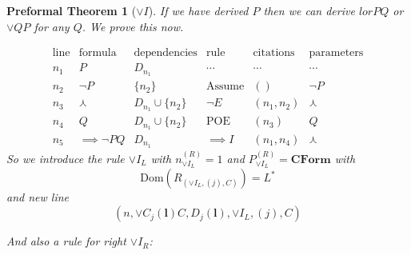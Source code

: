\documentclass[oneside, 12pt]{book}
\theoremstyle{break}
\newtheorem{preformal definition}[definition]{Preformal Definition}
\newtheorem{preformal theorem}[theorem]{Preformal Theorem}
\newcommand{\bv}[1]{\boldsymbol{#1}}
\begin{document}
		\begin{preformal theorem}[$\lor I$]
			If we have derived $P$ then we can derive $lor PQ$ or $\lor QP$ for any $Q$.
			We prove this now.
			
			\begin{equation*}
				\begin{array}{c|c|c|c|c|c}
					\text{line} & \text{formula} & \text{dependencies} & \text{rule} & \text{citations} & \text{parameters}\\ \hline
					n_1 & P & D_{n_1} & \cdots & \cdots & \cdots\\
					n_2 & \lnot P & \{n_2\} & \text{Assume} & () & \lnot P\\
					n_3 & \curlywedge & D_{n_1} \cup \{n_2\} & \lnot E & (n_1, n_2) & \curlywedge \\
					n_4 & Q & D_{n_1} \cup \{n_2\} & \text{POE} & (n_3) & Q\\
					n_5 & \implies \lnot P Q & D_{n_1} & \implies I & (n_1, n_4) & \curlywedge
				\end{array}
			\end{equation*}
			So we introduce the rule $\lor I_L$ with $n_{\lor I_L}^{(R)} = 1$ and $P_{\lor I_L}^{(R)} = \textbf{CForm}$ with
			\begin{equation*}
				\text{Dom}(R_{(\lor I_L, (j), C)}) = L^*
			\end{equation*}
			and new line
			\begin{equation*}
				(n, \lor C_j(\bv{l}) C, D_j(\bv{l}), \lor I_L, (j), C)
			\end{equation*}
			
			And also a rule for right $\lor I_R$:
			

\end{preformal theorem}
\end{document}
